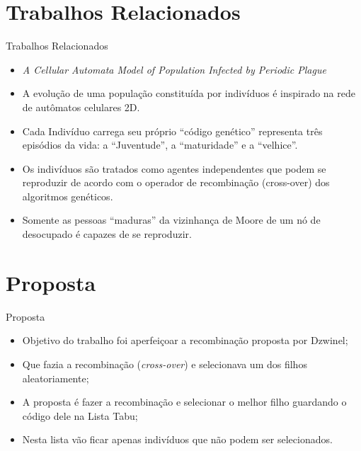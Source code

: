 \documentclass{beamer}
\begin{document}
\section{Trabalhos Relacionados}
\begin{frame}{Trabalhos Relacionados}
	\begin{itemize}
		\item \textit{A Cellular Automata Model of Population Infected by
		Periodic Plague} \cite{dzwinel:04}
		\item A evolução de uma população constituída por indivíduos é
		inspirado na rede de autômatos celulares 2D.
		\item Cada Indivíduo carrega seu próprio ``código genético''
		representa três episódios da vida: a ``Juventude'', a ``maturidade'' e
		a ``velhice''.
		\item Os indivíduos são tratados como agentes independentes que podem
		se reproduzir de acordo com o operador de recombinação (cross-over)
		dos algoritmos genéticos.
		\item Somente as pessoas ``maduras'' da vizinhança de Moore de um nó
		de desocupado é capazes de se reproduzir.
	\end{itemize}
\end{frame}

\section{Proposta}
\begin{frame}{Proposta}
	\begin{itemize}
		\item Objetivo do trabalho foi aperfeiçoar a recombinação proposta
		por Dzwinel;
		\item Que fazia a recombinação (\textit{cross-over}) e selecionava
		um dos filhos aleatoriamente;
		\item A proposta é fazer a recombinação e selecionar o melhor filho
		guardando o código dele na Lista Tabu;
		\item Nesta lista vão ficar apenas indivíduos que não podem ser
		selecionados.  
	\end{itemize}
\end{frame}
\end{document}
